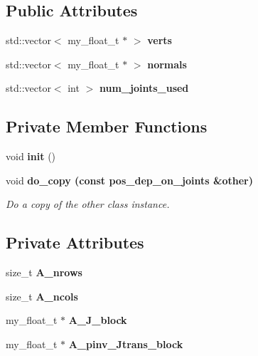 \subsection*{Public Attributes}
\begin{CompactItemize}
\item 
std::vector$<$ my\_\-float\_\-t $\ast$ $>$ \textbf{verts}\label{classASCbase_1_1pos__dep__on__joints_91721d7c401af41d94824188e80ad9f9}

\item 
std::vector$<$ my\_\-float\_\-t $\ast$ $>$ \textbf{normals}\label{classASCbase_1_1pos__dep__on__joints_f5e7d20d58cae9712b824f4cb41660b0}

\item 
std::vector$<$ int $>$ \textbf{num\_\-joints\_\-used}\label{classASCbase_1_1pos__dep__on__joints_6987ae9ce8f695eb21f9dc8d4ad7f296}

\end{CompactItemize}
\subsection*{Private Member Functions}
\begin{CompactItemize}
\item 
void \textbf{init} ()\label{classASCbase_1_1pos__dep__on__joints_904b7dd4afc1827c776ca2253c2e1add}

\item 
void \bf{do\_\-copy} (const \bf{pos\_\-dep\_\-on\_\-joints} \&other)
\begin{CompactList}\small\item\em Do a copy of the other class instance. \item\end{CompactList}\end{CompactItemize}
\subsection*{Private Attributes}
\begin{CompactItemize}
\item 
size\_\-t \textbf{A\_\-nrows}\label{classASCbase_1_1pos__dep__on__joints_ca7c5a4887e8864b3e979779014830f1}

\item 
size\_\-t \textbf{A\_\-ncols}\label{classASCbase_1_1pos__dep__on__joints_c9a33cb5cf6e0a3ca336546dc6ce0357}

\item 
my\_\-float\_\-t $\ast$ \textbf{A\_\-J\_\-block}\label{classASCbase_1_1pos__dep__on__joints_bc866573b0c3f4e4c77b67924fa40076}

\item 
my\_\-float\_\-t $\ast$ \textbf{A\_\-pinv\_\-Jtrans\_\-block}\label{classASCbase_1_1pos__dep__on__joints_800d04add909fab6d2d09bf41a298f40}

\end{CompactItemize}


